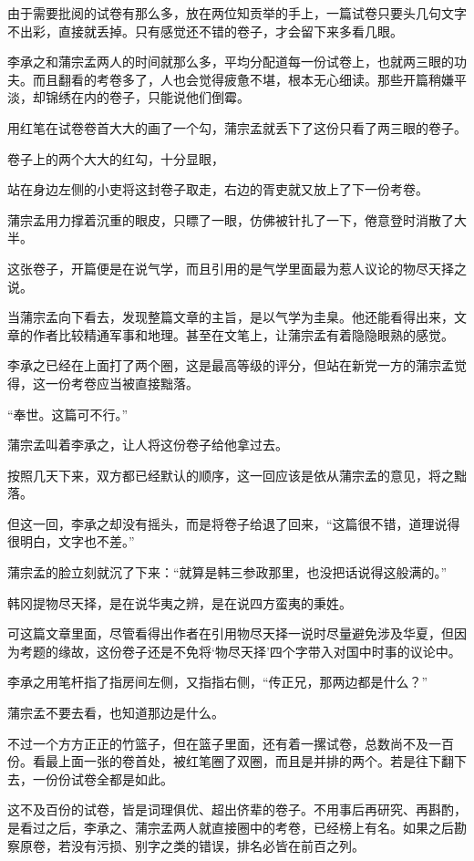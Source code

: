 由于需要批阅的试卷有那么多，放在两位知贡举的手上，一篇试卷只要头几句文字不出彩，直接就丢掉。只有感觉还不错的卷子，才会留下来多看几眼。

李承之和蒲宗孟两人的时间就那么多，平均分配道每一份试卷上，也就两三眼的功夫。而且翻看的考卷多了，人也会觉得疲惫不堪，根本无心细读。那些开篇稍嫌平淡，却锦绣在内的卷子，只能说他们倒霉。

用红笔在试卷卷首大大的画了一个勾，蒲宗孟就丢下了这份只看了两三眼的卷子。

卷子上的两个大大的红勾，十分显眼，

站在身边左侧的小吏将这封卷子取走，右边的胥吏就又放上了下一份考卷。

蒲宗孟用力撑着沉重的眼皮，只瞟了一眼，仿佛被针扎了一下，倦意登时消散了大半。

这张卷子，开篇便是在说气学，而且引用的是气学里面最为惹人议论的物尽天择之说。

当蒲宗孟向下看去，发现整篇文章的主旨，是以气学为圭臬。他还能看得出来，文章的作者比较精通军事和地理。甚至在文笔上，让蒲宗孟有着隐隐眼熟的感觉。

李承之已经在上面打了两个圈，这是最高等级的评分，但站在新党一方的蒲宗孟觉得，这一份考卷应当被直接黜落。

“奉世。这篇可不行。”

蒲宗孟叫着李承之，让人将这份卷子给他拿过去。

按照几天下来，双方都已经默认的顺序，这一回应该是依从蒲宗孟的意见，将之黜落。

但这一回，李承之却没有摇头，而是将卷子给退了回来，“这篇很不错，道理说得很明白，文字也不差。”

蒲宗孟的脸立刻就沉了下来：“就算是韩三参政那里，也没把话说得这般满的。”

韩冈提物尽天择，是在说华夷之辨，是在说四方蛮夷的秉姓。

可这篇文章里面，尽管看得出作者在引用物尽天择一说时尽量避免涉及华夏，但因为考题的缘故，这份卷子还是不免将‘物尽天择’四个字带入对国中时事的议论中。

李承之用笔杆指了指房间左侧，又指指右侧，“传正兄，那两边都是什么？”

蒲宗孟不要去看，也知道那边是什么。

不过一个方方正正的竹篮子，但在篮子里面，还有着一摞试卷，总数尚不及一百份。看最上面一张的卷首处，被红笔圈了双圈，而且是并排的两个。若是往下翻下去，一份份试卷全都是如此。

这不及百份的试卷，皆是词理俱优、超出侪辈的卷子。不用事后再研究、再斟酌，是看过之后，李承之、蒲宗孟两人就直接圈中的考卷，已经榜上有名。如果之后勘察原卷，若没有污损、别字之类的错误，排名必皆在前百之列。

